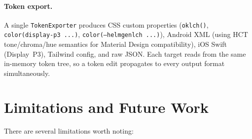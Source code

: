 \documentclass[11pt, twocolumn]{article}
\begin{document}
\paragraph{Token export.}
A single \texttt{TokenExporter} produces CSS custom properties
(\texttt{oklch()}, \texttt{color(display-p3 ...)},
\texttt{color(--helmgenlch ...)}), Android XML (using HCT
tone/chroma/hue semantics for Material Design compatibility),
iOS Swift (Display~P3), Tailwind config, and raw JSON. Each
target reads from the same in-memory token tree, so a token
edit propagates to every output format simultaneously.


\section{Limitations and Future Work}
\label{sec:limitations}

There are several limitations worth noting:
\end{document}
